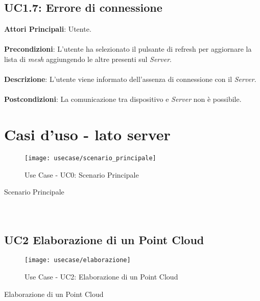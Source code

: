 \subsection{UC1.7: Errore di connessione}
\textbf{Attori Principali}: Utente.
\\\\ \textbf{Precondizioni}: L'utente ha selezionato il pulsante di refresh per aggiornare la lista di \emph{mesh} aggiungendo le altre presenti sul \emph{Server}.
\\\\ \textbf{Descrizione}: L'utente viene informato dell'assenza di connessione con il \emph{Server}.
\\\\ \textbf{Postcondizioni}: La comunicazione tra dispositivo e \emph{Server} non è possibile.



\section{Casi d'uso - lato server}
\begin{figure}[!h] 
    \centering 
    \texttt{[image: usecase/scenario\_principale]} 
    \caption{Use Case - UC0: Scenario Principale}
\end{figure}

\begin{usecase}{0}{Scenario Principale}
\\ 
\\ 
\\ 
\label{uc:scenario_principale}
\end{usecase}

\subsection{UC2 Elaborazione di un Point Cloud}
\begin{figure}[!h] 
    \centering 
    \texttt{[image: usecase/elaborazione]} 
    \caption{Use Case - UC2: Elaborazione di un Point Cloud}
\end{figure}

\begin{usecase}{2}{Elaborazione di un Point Cloud}
\\ 
\\ 
\\ 
\label{uc:elaborazione}
\end{usecase}

